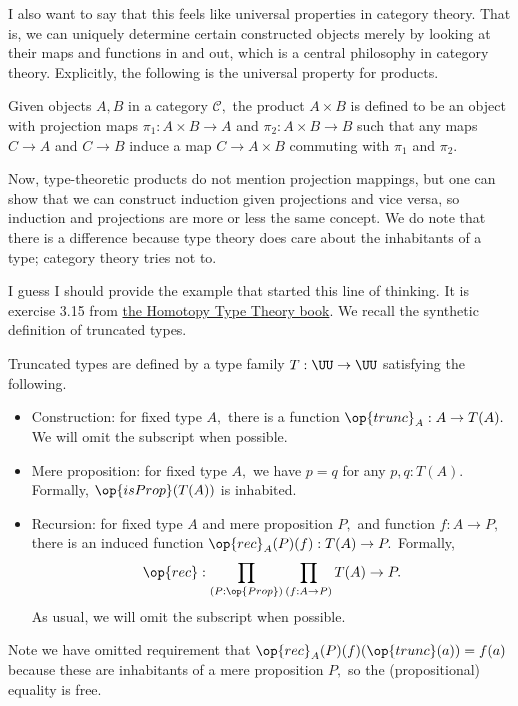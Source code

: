 I also want to say that this feels like universal properties in category theory. That is, we can uniquely determine certain constructed objects merely by looking at their maps and functions in and out, which is a central philosophy in category theory. Explicitly, the following is the universal property for products.
\begin{definition}
    Given objects $A,B$ in a category $\mathcal C,$ the product $A\times B$ is defined to be an object with projection maps $\pi_1:A\times B\to A$ and $\pi_2:A\times B\to B$ such that any maps $C\to A$ and $C\to B$ induce a map $C\to A\times B$ commuting with $\pi_1$ and $\pi_2.$
\end{definition}
Now, type-theoretic products do not mention projection mappings, but one can show that we can construct induction given projections and vice versa, so induction and projections are more or less the same concept. We do note that there is a difference because type theory does care about the inhabitants of a type; category theory tries not to.

I guess I should provide the example that started this line of thinking. It is exercise 3.15 from \href{https://hott.github.io/book/nightly/hott-online-1280-ga0040d8.pdf}{the Homotopy Type Theory book}. We recall the synthetic definition of truncated types.
\begin{definition}
    Truncated types are defined by a type family $T:\UU\to\UU$ satisfying the following.
    \begin{itemize}
        \item Construction: for fixed type $A,$ there is a function $\op{trunc}_A:A\to T(A).$ We will omit the subscript when possible.
        \item Mere proposition: for fixed type $A,$ we have $p=q$ for any $p,q:T(A).$ Formally, $\op{isProp}(T(A))$ is inhabited.
        \item Recursion: for fixed type $A$ and mere proposition $P,$ and function $f:A\to P,$ there is an induced function $\op{rec}_A(P)(f):T(A)\to P.$ Formally,
        \[\op{rec}:\prod_{(P:\op{Prop})}\prod_{(f:A\to P)}T(A)\to P.\]
        As usual, we will omit the subscript when possible.
    \end{itemize}
\end{definition}
Note we have omitted requirement that $\op{rec}_A(P)(f)(\op{trunc}(a))=f(a)$ because these are inhabitants of a mere proposition $P,$ so the (propositional) equality is free.

